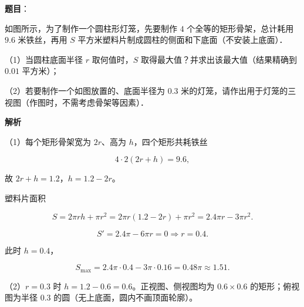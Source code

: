 \begin{answer}

\textbf{题目}：

如图所示，为了制作一个圆柱形灯笼，先要制作 $4$ 个全等的矩形骨架，总计耗用 $9.6$ 米铁丝，再用 $S$ 平方米塑料片制成圆柱的侧面和下底面（不安装上底面）．

（1）当圆柱底面半径 $r$ 取何值时，$S$ 取得最大值？并求出该最大值（结果精确到 $0.01$ 平方米）；

（2）若要制作一个如图放置的、底面半径为 $0.3$ 米的灯笼，请作出用于灯笼的三视图（作图时，不需考虑骨架等因素）．
\nopagebreak[4]
\begin{center}\end{center}
\nopagebreak[4]
\textbf{解析}

（1）每个矩形骨架宽为 $2r$、高为 $h$，四个矩形共耗铁丝

\nopagebreak[4]
\[4\cdot2(2r+h)=9.6,\]

故 $2r+h=1.2$，$h=1.2-2r$。

塑料片面积

\nopagebreak[4]
\[S=2\pi rh+\pi r^2
=2\pi r(1.2-2r)+\pi r^2
=2.4\pi r-3\pi r^2.\]

\nopagebreak[4]
\[S'=2.4\pi-6\pi r=0\Longrightarrow r=0.4.\]

此时 $h=0.4$，

\nopagebreak[4]
\[S_{\max}=2.4\pi\cdot0.4-3\pi\cdot0.16
=0.48\pi\approx1.51.\]

（2）$r=0.3$ 时 $h=1.2-0.6=0.6$。正视图、侧视图均为 $0.6\times0.6$ 的矩形；俯视图为半径 $0.3$ 的圆（无上底面，圆内不画顶面轮廓）。


\end{answer}
